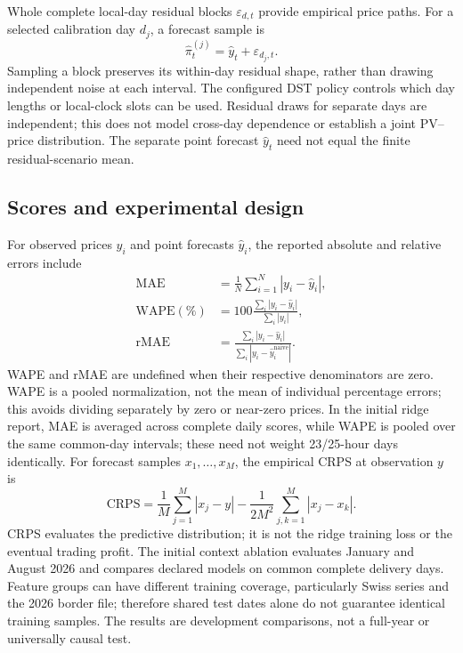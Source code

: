 \documentclass[11pt,a4paper]{article}
\begin{document}
Whole complete local-day residual blocks $\varepsilon_{d,t}$ provide empirical
price paths. For a selected calibration day $d_j$, a forecast sample is
\begin{equation}
 \hat\pi^{(j)}_t=\hat y_t+\varepsilon_{d_j,t}.
\end{equation}
Sampling a block preserves its within-day residual shape, rather than drawing
independent noise at each interval. The configured DST policy controls which
day lengths or local-clock slots can be used. Residual draws for separate days
are independent; this does not model cross-day dependence or establish a joint
PV--price distribution. The separate point forecast $\hat y_t$ need not equal
the finite residual-scenario mean.

\subsection{Scores and experimental design}
For observed prices $y_i$ and point forecasts $\hat y_i$, the reported absolute
and relative errors include
\begin{align}
 \mathrm{MAE}&=\frac1N\sum_{i=1}^N|y_i-\hat y_i|,\\
 \mathrm{WAPE}(\%)&=100\frac{\sum_i|y_i-\hat y_i|}{\sum_i|y_i|},\\
 \mathrm{rMAE}&=\frac{\sum_i|y_i-\hat y_i|}{\sum_i|y_i-\hat y_i^{\mathrm{naive}}|}.
\end{align}
WAPE and rMAE are undefined when their respective denominators are zero. WAPE
is a pooled normalization, not the mean of individual percentage errors; this
avoids dividing separately by zero or near-zero prices. In the initial ridge
report, MAE is averaged across complete daily scores, while WAPE is pooled over
the same common-day intervals; these need not weight 23/25-hour days identically.
For forecast samples $x_1,\ldots,x_M$, the empirical CRPS at observation $y$
is
\begin{equation}
 \mathrm{CRPS}=\frac1M\sum_{j=1}^{M}|x_j-y|
 -\frac{1}{2M^2}\sum_{j,k=1}^{M}|x_j-x_k|.
\end{equation}
CRPS evaluates the predictive distribution; it is not the ridge training loss
or the eventual trading profit. The initial context ablation evaluates January
and August 2026 and compares declared models on common complete delivery days.
Feature groups can have different training coverage, particularly Swiss series
and the 2026 border file; therefore shared test dates alone do not guarantee
identical training samples. The results are development comparisons, not a
full-year or universally causal test.
\end{document}
